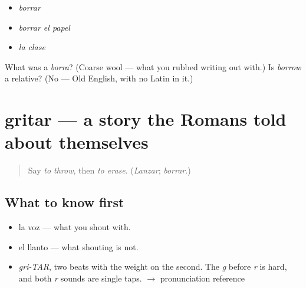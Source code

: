 \begin{itemize}
\raggedright
  \item \emph{borrar}
  \item \emph{borrar el papel}
  \item \emph{la clase}
\end{itemize}

\begin{tcolorbox}[breakable,colback=teal!4,colframe=teal!35!black,title={Before you move on}]
What was a \emph{borra}? (Coarse wool — what you rubbed writing out with.) Is \emph{borrow} a relative? (No — Old English, with no Latin in it.)
\end{tcolorbox}
\section[gritar]{gritar — a story the Romans told about themselves}

\label{lesson:ES-C388-gritar}



\begin{quote}
Say \emph{to throw}, then \emph{to erase}. (\emph{Lanzar}; \emph{borrar}.)
\end{quote}

\subsection*{What to know first}
\begin{itemize}
\raggedright
  \item la voz — what you shout with.
  \item el llanto — what shouting is not.
\end{itemize}

\begin{sounds}
\begin{itemize}
\raggedright
  \item \emph{gri-TAR}, two beats with the weight on the second. The \emph{g} before \emph{r} is hard, and both \emph{r} sounds are single taps. $\to$ pronunciation reference
\end{itemize}
\end{sounds}

